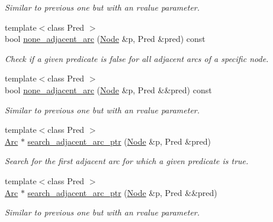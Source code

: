 \begin{DoxyCompactItemize}
\begin{DoxyCompactList}\small\item\em Similar to previous one but with an rvalue parameter. \end{DoxyCompactList}\item 
{\footnotesize template$<$class Pred $>$ }\\bool \hyperlink{class_designar_1_1_base_graph_acf4b230e0d981f36770722011c96206f}{none\+\_\+adjacent\+\_\+arc} (\hyperlink{namespace_designar_a5af326c65aa2bd26b26c410f2030d09e}{Node} \&p, Pred \&pred) const
\begin{DoxyCompactList}\small\item\em Check if a given predicate is false for all adjacent arcs of a specific node. \end{DoxyCompactList}\item 
{\footnotesize template$<$class Pred $>$ }\\bool \hyperlink{class_designar_1_1_base_graph_adbacdf829cb2f21aff498bac9c9a8b8b}{none\+\_\+adjacent\+\_\+arc} (\hyperlink{namespace_designar_a5af326c65aa2bd26b26c410f2030d09e}{Node} \&p, Pred \&\&pred) const
\begin{DoxyCompactList}\small\item\em Similar to previous one but with an rvalue parameter. \end{DoxyCompactList}\item 
{\footnotesize template$<$class Pred $>$ }\\\hyperlink{namespace_designar_a3f55fb5513d62ff47cbc8f72b8e95d6f}{Arc} $\ast$ \hyperlink{class_designar_1_1_base_graph_a0fc6cebdbc639235992617c49f8d395e}{search\+\_\+adjacent\+\_\+arc\+\_\+ptr} (\hyperlink{namespace_designar_a5af326c65aa2bd26b26c410f2030d09e}{Node} \&p, Pred \&pred)
\begin{DoxyCompactList}\small\item\em Search for the first adjacent arc for which a given predicate is true. \end{DoxyCompactList}\item 
{\footnotesize template$<$class Pred $>$ }\\\hyperlink{namespace_designar_a3f55fb5513d62ff47cbc8f72b8e95d6f}{Arc} $\ast$ \hyperlink{class_designar_1_1_base_graph_ab556185621be46883278bb3d707ab32b}{search\+\_\+adjacent\+\_\+arc\+\_\+ptr} (\hyperlink{namespace_designar_a5af326c65aa2bd26b26c410f2030d09e}{Node} \&p, Pred \&\&pred)
\begin{DoxyCompactList}\small\item\em Similar to previous one but with an rvalue parameter. \end{DoxyCompactList}\item 

\end{DoxyCompactItemize}
